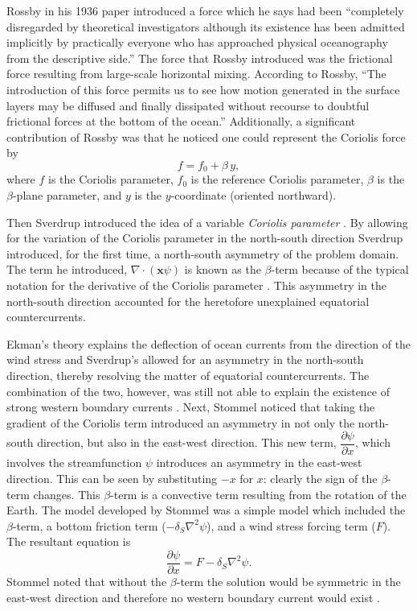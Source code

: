 Rossby in his 1936 paper \cite{Rossby1936} introduced a force which he says had
been ``completely disregarded by theoretical investigators although its
existence has been admitted implicitly by practically everyone who has approached
physical oceanography from the descriptive side.'' The force that Rossby
introduced was the frictional force resulting from large-scale horizontal
mixing. According to Rossby, ``The introduction of this force permits us to see
how motion generated in the surface layers may be diffused and finally
dissipated without recourse to doubtful frictional forces at the bottom of the
ocean.'' Additionally, a significant contribution of Rossby was that he noticed
one could represent the Coriolis force by \cite{James2009}
\begin{equation}
  f = f_0 + \beta\, y,
  \label{eqn:CoriolisParameterization}
\end{equation}
where $f$ is the Coriolis parameter, $f_0$ is the reference Coriolis parameter,
$\beta$ is the $\beta$-plane parameter, and $y$ is the $y$-coordinate (oriented
northward).

Then Sverdrup introduced the idea of a variable \emph{Coriolis parameter}
\cite{Fox-Kemper2003}. By allowing for the variation of the Coriolis parameter
in the north-south direction Sverdrup \cite{Sverdrup1947} introduced, for the
first time, a north-south asymmetry of the problem domain. The term he
introduced, $\nabla \cdot (\mathbf{x} \psi)$ is known as the $\beta$-term
because of the typical notation for the derivative of the Coriolis parameter
\cite{Fox-Kemper2003}. This asymmetry in the north-south direction accounted for
the heretofore unexplained equatorial countercurrents.

Ekman's theory explains the deflection of ocean currents from the direction of
the wind stress and Sverdrup's allowed for an asymmetry in the north-south
direction, thereby resolving the matter of equatorial countercurrents.  The
combination of the two, however, was still not able to explain the existence of
strong western boundary currents \cite{Fox-Kemper2003}.  Next, Stommel
\cite{Stommel1948} noticed that taking the gradient of the Coriolis term
introduced an asymmetry in not only the north-south direction, but also in the
east-west direction. This new term, $\dfrac{\partial \psi}{\partial x}$, which
involves the streamfunction $\psi$ introduces an asymmetry in the east-west
direction. This can be seen by substituting $-x$ for $x$: clearly the sign of
the $\beta$-term changes. This $\beta$-term is a convective term resulting from
the rotation of the Earth. The model developed by Stommel was a simple model
which included the $\beta$-term, a bottom friction term ($-\delta_S \nabla^2
\psi$), and a wind stress forcing term ($F$).  The resultant equation is
\cite{Fox-Kemper2003,Stommel1948,Vallis06}
\begin{equation}
  \frac{\partial \psi}{\partial x} = F - \delta_S \nabla^2 \psi.
  \label{eqn:StommelModel}
\end{equation}
Stommel noted that without the $\beta$-term the solution would be
symmetric in the east-west direction and therefore no western boundary current
would exist \cite{Stommel1948}.

